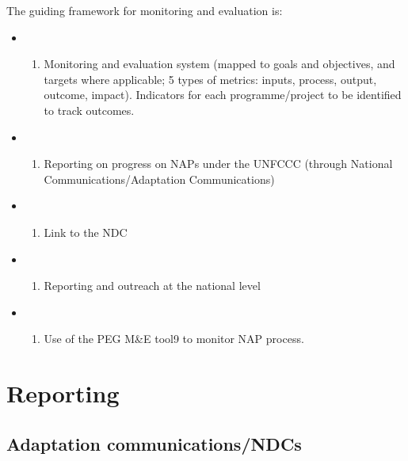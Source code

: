 \documentclass[
]{book}
\providecommand{\tightlist}{%
  \setlength{\itemsep}{0pt}\setlength{\parskip}{0pt}}
\begin{document}
The guiding framework for monitoring and evaluation is:

\begin{itemize}
\item
  \begin{enumerate}
  \def\labelenumi{\alph{enumi}.}
  \tightlist
  \item
    Monitoring and evaluation system (mapped to goals and objectives, and targets where applicable; 5 types of metrics: inputs, process, output, outcome, impact). Indicators for each programme/project to be identified to track outcomes.
  \end{enumerate}
\item
  \begin{enumerate}
  \def\labelenumi{\alph{enumi}.}
  \setcounter{enumi}{1}
  \tightlist
  \item
    Reporting on progress on NAPs under the UNFCCC (through National Communications/Adaptation Communications)
  \end{enumerate}
\item
  \begin{enumerate}
  \def\labelenumi{\alph{enumi}.}
  \setcounter{enumi}{2}
  \tightlist
  \item
    Link to the NDC
  \end{enumerate}
\item
  \begin{enumerate}
  \def\labelenumi{\alph{enumi}.}
  \setcounter{enumi}{3}
  \tightlist
  \item
    Reporting and outreach at the national level
  \end{enumerate}
\item
  \begin{enumerate}
  \def\labelenumi{\alph{enumi}.}
  \setcounter{enumi}{4}
  \tightlist
  \item
    Use of the PEG M\&E tool9 to monitor NAP process.
  \end{enumerate}
\end{itemize}

\hypertarget{reporting}{%
\chapter{Reporting}\label{reporting}}

\hypertarget{adaptation-communicationsndcs}{%
\section{Adaptation communications/NDCs}\label{adaptation-communicationsndcs}}
\end{document}
